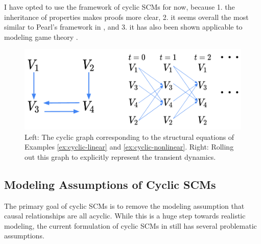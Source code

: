 \documentclass[12pt]{article}
\begin{document}

I have opted to use the framework of cyclic SCMs for now, because 1. the inheritance of properties makes proofs more clear, 2. it seems overall the most similar to Pearl's framework in \cite{pearl_2009}, and 3. it has also been shown applicable to modeling game theory \cite{CausalGames}.

\begin{figure}
\centering
\includegraphics[width=.5\linewidth]{pics/my_own/rolled_out.png}
\caption{Left: The cyclic graph corresponding to the structural equations of Examples \ref{ex:cyclic-linear} and \ref{ex:cyclic-nonlinear}. Right: Rolling out this graph to explicitly represent the transient dynamics.}
\label{fig:rolled-out}
\end{figure}


\newpage
\subsection{Modeling Assumptions of Cyclic SCMs}\label{modeling}

The primary goal of cyclic SCMs is to remove the modeling assumption that causal relationships are all acyclic. While this is a huge step towards realistic modeling, the current formulation of cyclic SCMs in \cite{Foundations} still has several problematic assumptions.
\end{document}
